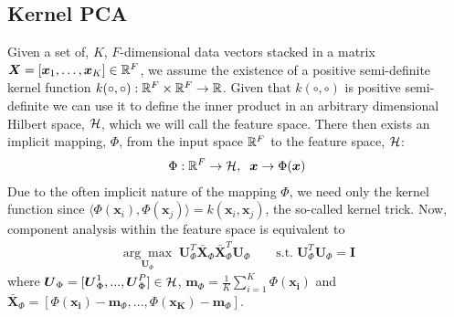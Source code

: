 \subsection{Kernel PCA}\label{sec:kpca}
Given a set of, $K$, $F$-dimensional data vectors stacked in a matrix $ \boldsymbol{X} = [\boldsymbol{x}_1, \ldots, \boldsymbol{x}_K] \in \mathbb{R}^F$, we assume the existence of a positive semi-definite kernel function $k(\circ, \circ) : \mathbb{R}^F \times \mathbb{R}^F \rightarrow \mathbb{R}$. Given that $k(\circ, \circ)$ is positive semi-definite we can use it to define the inner product in an arbitrary dimensional Hilbert space, $\mathcal{H}$, which we will call the feature space. There then exists an implicit mapping, $\Phi$, from the input space $\mathbb{R}^F$ to the feature space, $\mathcal{H}$:
\begin{equation}
    \begin{aligned}\label{eq:implicit-map}
        \Phi : \R^F \rightarrow \hilbert, \; \; \boldsymbol{x} \rightarrow \Phi(\boldsymbol{x})
    \end{aligned}
\end{equation}
Due to the often implicit nature of the mapping $\Phi$, we need only the kernel function since $\langle \Phi(\boldsymbol{x}_i), \Phi(\boldsymbol{x}_j) \rangle  = k (\boldsymbol{x}_i, \boldsymbol{x}_j)$, the so-called kernel trick. Now, component analysis within the feature space is equivalent to
\begin{equation}
    \begin{aligned}\label{eq:feature-space-pca}
        \underset{\boldsymbol{U}_\Phi}{\arg\max} \; \boldsymbol{U}_\Phi^T \bar{\boldsymbol{X}}_\Phi \bar{\boldsymbol{X}}_\Phi^T \boldsymbol{U}_\Phi \qquad \text{s.t.} \; \boldsymbol{U}_\Phi^T \boldsymbol{U}_\Phi = \boldsymbol{I}
    \end{aligned}
\end{equation}
where $\boldsymbol{U}_\Phi = [\boldsymbol{U}_\Phi^1, ..., \boldsymbol{U}_\Phi^P] \in \mathcal{H}$, $\boldsymbol{m}_\Phi = \frac{1}{K} \sum \limits_{i=1}^K \Phi(\boldsymbol{x_i})$ and $\bar{\boldsymbol{X}}_\Phi = [\Phi(\boldsymbol{x_i}) - \boldsymbol{m}_\Phi, ..., \Phi(\boldsymbol{x_K}) - \boldsymbol{m}_\Phi]$.

